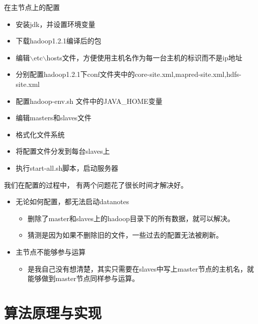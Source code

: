 \documentclass[forprint]{myreport}
\begin{document}
在主节点上的配置

\begin{itemize}
  \item 安装jdk，并设置环境变量
  \item 下载hadoop1.2.1编译后的包
  \item 编辑$\backslash$etc$\backslash$hosts文件，方便使用主机名作为每一台主机的标识而不是ip地址
  \item 分别配置hadoop1.2.1下conf文件夹中的core-site.xml,mapred-site.xml,hdfs-site.xml
  \item 配置hadoop-env.sh 文件中的JAVA\_HOME变量
  \item 编辑masters和slaves文件
  \item 格式化文件系统
  \item 将配置文件分发到每台slaves上
  \item 执行start-all.sh脚本，启动服务器
\end{itemize}

\begin{tcolorbox}[title = {配置过程中出现的一些问题}]
我们在配置的过程中， 有两个问题花了很长时间才解决好。
\tcblower

\begin{itemize}
  \item 无论如何配置，都无法启动datanotes
  \begin{itemize}
    \item 删除了master和slaves上的hadoop目录下的所有数据，就可以解决。
    \item 猜测是因为如果不删除旧的文件，一些过去的配置无法被刷新。
  \end{itemize}
  \item 主节点不能够参与运算
  \begin{itemize}
    \item 是我自己没有想清楚，其实只需要在slaves中写上master节点的主机名，就能够做到master节点同样参与运算。
  \end{itemize}
\end{itemize}

\end{tcolorbox}

\chapter{算法原理与实现}
\end{document}
